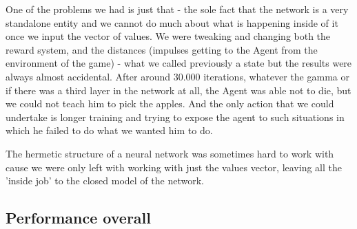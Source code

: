 \documentclass[]{article}
\begin{document}
\par One of the problems we had is just that - the sole fact that the network is a very standalone entity and we cannot do much about what is happening inside of it once we input the vector of values. We were tweaking and changing both the reward system, and the distances (impulses getting to the Agent from the environment of the game) - what we called previously a state but the results were always almost accidental. After around 30.000 iterations, whatever the gamma or if there was a third layer in the network at all, the Agent was able not to die, but we could not teach him to pick the apples. And the only action that we could undertake is longer training and trying to expose the agent to such situations in which he failed to do what we wanted him to do. 

\par The hermetic structure of a neural network was sometimes hard to work with cause we were only left with working with just the values vector, leaving all the 'inside job' to the closed model of the network.

\subsection{Performance overall}
\end{document}
